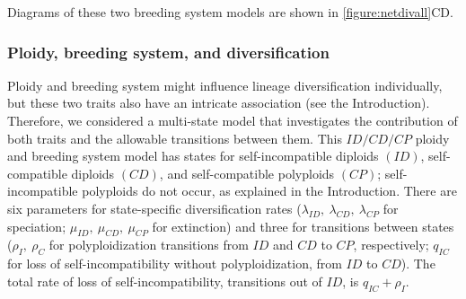 Diagrams of these two breeding system models are shown in \cref{figure:netdivall}CD.  %

\subsubsection{Ploidy, breeding system, and diversification}

Ploidy and breeding system might influence lineage diversification individually, but these two traits also have an intricate association (see the Introduction).
Therefore, we considered a multi-state model that investigates the contribution of both traits and the allowable transitions between them.
This $ID/CD/CP$ ploidy and breeding system model has states for self-incompatible diploids $(ID)$, self-compatible diploids $(CD)$, and self-compatible polyploids $(CP)$; self-incompatible polyploids do not occur, as explained in the Introduction.
There are six parameters for state-specific diversification rates ($\lambda_{ID},\ \lambda_{CD},\ \lambda_{CP}$ for speciation; $\mu_{ID},\ \mu_{CD},\ \mu_{CP}$ for extinction) and three for transitions between states ($\rho_I,\ \rho_C$ for polyploidization transitions from $ID$ and $CD$ to $CP$, respectively; $q_{IC}$ for loss of self-incompatibility without polyploidization, from $ID$ to $CD$).
The total rate of loss of self-incompatibility, \ie transitions out of $ID$, is $q_{IC} + \rho_I$.

